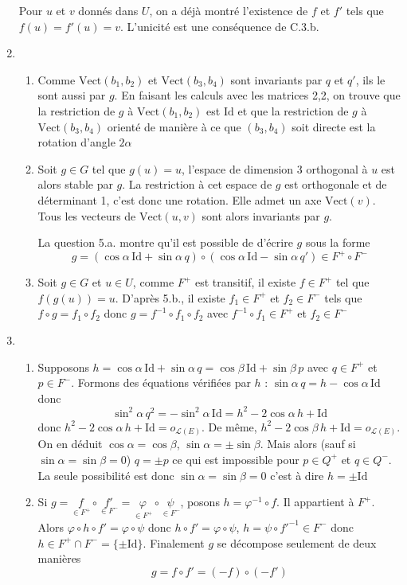 \begin{enumerate}
Pour $u$ et $v$ donnés dans $U$, on a déjà montré l'existence de $f$ et $f'$ tels que $f(u)=f'(u)=v$. L'unicité est une conséquence de C.3.b.
\item \begin{enumerate}
\item Comme $\mathrm{Vect}(b_{1},b_{2})$ et $\mathrm{Vect}(b_{3},b_{4})$ sont invariants par $q$ et $q'$, ils le sont aussi par $g$. En faisant les calculs avec les matrices 2,2, on trouve que la restriction de $g$ à $\mathrm{Vect}(b_{1},b_{2})$ est $\mathrm{Id}$ et que la restriction de $g$ à $\mathrm{Vect}(b_{3},b_{4})$ orienté de manière à ce que $(b_{3},b_{4})$ soit directe est la rotation d'angle $2\alpha$
\item Soit $g\in G$ tel que $g(u)=u$, l'espace de dimension 3 orthogonal à $u$ est alors stable par $g$. La restriction à cet espace de $g$ est orthogonale et de déterminant 1, c'est donc une rotation. Elle admet un axe $\mathrm{Vect}(v)$. Tous les vecteurs de $\mathrm{Vect}(u,v)$ sont alors invariants par $g$.

La question 5.a. montre qu'il est possible de d'écrire $g$ sous la forme
\[g=(\cos\alpha\,\mathrm{Id}+\sin\alpha\,q )\circ(\cos\alpha\,\mathrm{Id}-\sin\alpha\,q' )\in F^{+}\circ F^{-}\]
\item Soit $g\in G$ et $u\in U$, comme $F^{+}$ est transitif, il existe $f\in F^{+}$ tel que $f(g(u))=u$. D'après 5.b., il existe $f_{1}\in F^{+}$ et $f_{2}\in F^{-}$ tels que $f\circ g= f_{1}\circ f_{2}$ donc $g=f^{-1}\circ f_{1}\circ f_{2}$ avec $ f^{-1}\circ f_{1}\in F^{+}$ et $f_{2}\in F^{-}$ 
\end{enumerate}
\item \begin{enumerate}
\item Supposons $h=\cos\alpha\,\mathrm{Id}+\sin\alpha\,q=\cos\beta\,\mathrm{Id}+\sin\beta\,p$ avec $q\in F^{+}$ et $p\in F^{-}$. Formons des équations vérifiées par $h$ : $\sin \alpha \, q=h-\cos\alpha \,\mathrm{Id}$ donc 
\[\sin^{2}\alpha \,q^{2}=-\sin^{2}\alpha \,\mathrm{Id}=h^{2}-2\cos\alpha\,h+\mathrm{Id}\]
donc $ h^{2}-2\cos\alpha\,h+\mathrm{Id}=o_{\mathcal{L}(E)}$. De même, $ h^{2}-2\cos\beta\,h+\mathrm{Id}=o_{\mathcal{L}(E)}$. On en déduit $\cos\alpha=\cos\beta$, $\sin\alpha=\pm \sin \beta$. Mais alors (sauf si $\sin\alpha=\sin \beta =0$) $q=\pm p$ ce qui est impossible pour $p\in Q^{+}$ et $q\in Q^{-}$. La seule possibilité est donc $\sin\alpha=\sin \beta =0$ c'est à dire $h=\pm \mathrm{Id}$
\item Si $g=\underset{\in F^{+}}{f}\circ \underset{\in F^{-}}{f'}=\underset{\in F^{+}}{\varphi}\circ \underset{\in F^{-}}{\psi }$, posons $h=\varphi^{-1}\circ f$. Il appartient à $F^{+}$. Alors $\varphi\circ h\circ f'=\varphi\circ\psi$ donc $h\circ f'=\varphi\circ\psi$, $h=\psi\circ f'^{-1}\in F^{-}$ donc $h\in F^{+}\cap F^{-}=\{\pm \mathrm{Id}\}$. Finalement $g$ se décompose seulement de deux manières
\[g=f\circ f'= (-f)\circ (-f')\]
\end{enumerate}

\end{enumerate}


